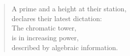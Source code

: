 
\thispagestyle{plain}

\section*{}



\vspace*{7cm}

\begin{verse}
    \hspace{8em}A prime and a height at their station, \\
    \vspace{5pt}
    \hspace{8em}declares their latest dictation: \\
    \vspace{5pt}
    \hspace{8em}The chromatic tower, \\
    \vspace{5pt}
    \hspace{8em}is in increasing power, \\
    \vspace{5pt}
    \hspace{8em}described by algebraic information.

\end{verse}










